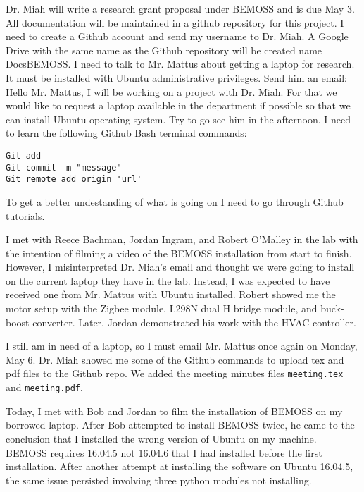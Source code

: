 \documentclass[fontsize=11pt, %
                             paper=letter, %
                             twoside, %
                             captions=tableheading,
                             index=totoc,
                             hyperref]{labbook}
\begin{document}
\begin{addmargin}[0cm]{0cm}
Dr. Miah will write a research grant proposal under BEMOSS and is due May 3.
\bigbreak\noindent
All documentation will be maintained in a github repository for this project.
I need to create a Github account and send my username to Dr. Miah. A Google Drive with the same name as the Github repository will be created name DocsBEMOSS.
\bigbreak\noindent
I need to talk to Mr. Mattus about getting a laptop for research. It must be installed with Ubuntu administrative privileges. 
\bigbreak\noindent
Send him an email:
\bigbreak\noindent
Hello Mr. Mattus, I will be working on a project with Dr. Miah. For that we would like to request a laptop available in the department if possible so that we can install Ubuntu operating system. 
\bigbreak\noindent
Try to go see him in the afternoon.
\bigbreak\noindent
I need to learn the following Github Bash terminal commands:
\begin{verbatim}
Git add
Git commit -m "message"
Git remote add origin 'url'
\end{verbatim}
To get a better undestanding of what is going on I need to go through Github tutorials.

I met with Reece Bachman, Jordan Ingram, and Robert O'Malley in the lab with the intention of filming a video of the BEMOSS installation from start to finish. However, I misinterpreted Dr. Miah's email and thought we were going to install on the current laptop they have in the lab. Instead, I was expected to have received one from Mr. Mattus with Ubuntu installed. Robert showed me the motor setup with the Zigbee module, L298N dual H bridge module, and buck-boost converter. Later, Jordan demonstrated his work with the HVAC controller.

I still am in need of a laptop, so I must email Mr. Mattus once again on Monday, May 6.
\bigbreak\noindent
Dr. Miah showed me some of the Github commands to upload tex and pdf files to the Github repo. We added the meeting minutes files \texttt{meeting.tex} and \texttt{meeting.pdf}.

Today, I met with Bob and Jordan to film the installation of BEMOSS on my borrowed laptop. After Bob attempted to install BEMOSS twice, he came to the conclusion that I installed the wrong version of Ubuntu on my machine. BEMOSS requires 16.04.5 not 16.04.6 that I had installed before the first installation. After another attempt at installing the software on Ubuntu 16.04.5, the same issue persisted involving three python modules not installing.
\end{addmargin}
\end{document}
